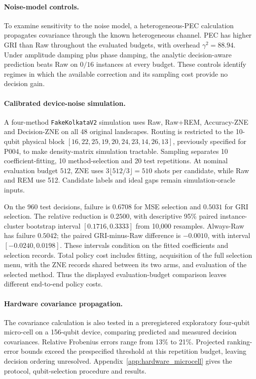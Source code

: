 \documentclass[a4paper,onecolumn,unpublished,nopdfoutputerror]{quantumarticle}
\theoremstyle{plain}
\theoremstyle{definition}
\newcommand{\1}{\mathbf{1}}
\begin{document}
\paragraph{Noise-model controls.}
To examine sensitivity to the noise model, a heterogeneous-PEC calculation propagates covariance through the known heterogeneous channel. PEC has higher GRI than Raw throughout the evaluated budgets, with overhead $\gamma^2=88.94$. Under amplitude damping plus phase damping, the analytic decision-aware prediction beats Raw on $0/16$ instances at every budget. These controls identify regimes in which the available correction and its sampling cost provide no decision gain.

\paragraph{Calibrated device-noise simulation.}
A four-method \texttt{FakeKolkataV2} simulation uses Raw, Raw+REM, Accuracy-ZNE and Decision-ZNE on all 48 original landscapes. Routing is restricted to the 10-qubit physical block $[16,22,25,19,20,24,23,14,26,13]$, previously specified for P004, to make density-matrix simulation tractable. Sampling separates 10 coefficient-fitting, 10 method-selection and 20 test repetitions. At nominal evaluation budget $512$, ZNE uses $3\lfloor512/3\rfloor=510$ shots per candidate, while Raw and REM use 512. Candidate labels and ideal gaps remain simulation-oracle inputs.

On the 960 test decisions, failure is $0.6708$ for MSE selection and $0.5031$ for GRI selection. The relative reduction is $0.2500$, with descriptive 95\% paired instance-cluster bootstrap interval $[0.1716,0.3333]$ from 10,000 resamples. Always-Raw has failure $0.5042$; the paired GRI-minus-Raw difference is $-0.0010$, with interval $[-0.0240,0.0198]$. These intervals condition on the fitted coefficients and selection records. Total policy cost includes fitting, acquisition of the full selection menu, with the ZNE records shared between its two arms, and evaluation of the selected method. Thus the displayed evaluation-budget comparison leaves different end-to-end policy costs.

\paragraph{Hardware covariance propagation.}
The covariance calculation is also tested in a preregistered exploratory four-qubit micro-cell on a 156-qubit device, comparing predicted and measured decision covariances. Relative Frobenius errors range from 13\% to 21\%. Projected ranking-error bounds exceed the prespecified threshold at this repetition budget, leaving decision ordering unresolved. Appendix~\ref{app:hardware_microcell} gives the protocol, qubit-selection procedure and results.
\end{document}
